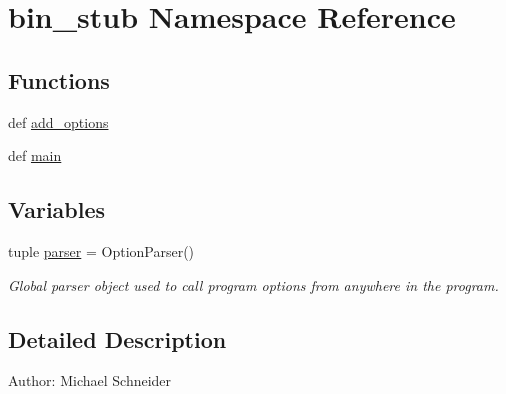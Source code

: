 \hypertarget{namespacebin__stub}{\section{bin\-\_\-stub Namespace Reference}
\label{namespacebin__stub}
}
\subsection*{Functions}
\begin{DoxyCompactItemize}
\item 
def \hyperlink{namespacebin__stub_ab0e92824bae01b4172b593381ea92eeb}{add\-\_\-options}
\item 
def \hyperlink{namespacebin__stub_afab6fce7b4902ca48336e24852da2c44}{main}
\end{DoxyCompactItemize}
\subsection*{Variables}
\begin{DoxyCompactItemize}
\item 
tuple \hyperlink{namespacebin__stub_a0f2972e8890d3aedcb1621ec191ef8f9}{parser} = Option\-Parser()
\begin{DoxyCompactList}\small\item\em Global parser object used to call program options from anywhere in the program. \end{DoxyCompactList}\end{DoxyCompactItemize}


\subsection{Detailed Description}
\begin{DoxyVerb}Author: Michael Schneider
\end{DoxyVerb}
 

